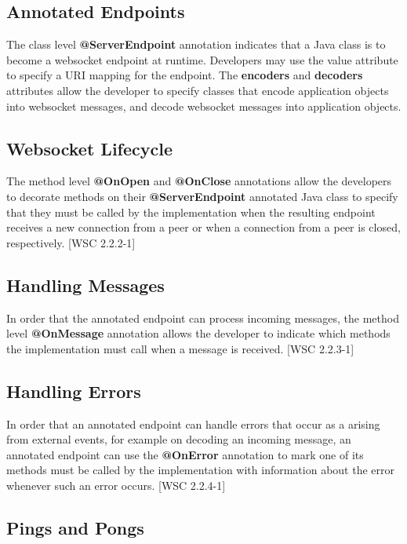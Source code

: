 \subsection{Annotated Endpoints}

The class level \textbf{@ServerEndpoint} annotation indicates that a Java class is to become a websocket endpoint at runtime. Developers may use the value attribute to specify a URI mapping for the endpoint. The \textbf{encoders} and \textbf{decoders} attributes allow the developer to specify classes that encode application objects into websocket messages, and decode websocket messages into application objects.

\subsection{Websocket Lifecycle}

The method level \textbf{@OnOpen} and \textbf{@OnClose} annotations allow the developers to decorate methods on their \textbf{@ServerEndpoint} annotated Java class to specify that they must be called by the implementation when the resulting endpoint receives a new connection from a peer or when a connection from a peer is closed, respectively. [WSC 2.2.2-1]

\subsection{Handling Messages}

In order that the annotated endpoint can process incoming messages, the method level \textbf{@OnMessage} annotation allows the developer to indicate which methods the implementation must call when a message is received.  [WSC 2.2.3-1]

\subsection{Handling Errors}

In order that an annotated endpoint can handle errors that occur as a arising from external events, for example on decoding an incoming message, an annotated endpoint can use the \textbf{@OnError} annotation to mark one of its methods must be called by the implementation with information about the error whenever such an error occurs. [WSC 2.2.4-1]

\subsection{Pings and Pongs}

